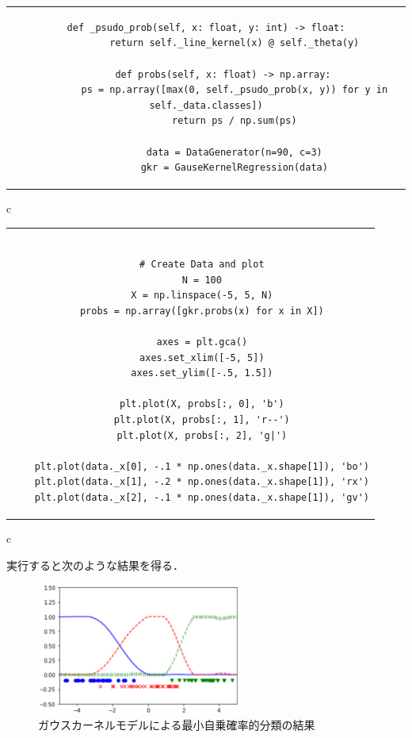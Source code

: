 \documentclass[fleqn]{jsarticle}
\begin{document}
\begin{center}
\begin{tabular}{c}
\begin{lstlisting}[]
      def _psudo_prob(self, x: float, y: int) -> float:
          return self._line_kernel(x) @ self._theta(y)

      def probs(self, x: float) -> np.array:
          ps = np.array([max(0, self._psudo_prob(x, y)) for y in self._data.classes])
          return ps / np.sum(ps)

          data = DataGenerator(n=90, c=3)
          gkr = GauseKernelRegression(data)
  \end{lstlisting}
\end{tabular}{c}
\end{center}

\begin{center}
  \begin{tabular}{c}
  \begin{lstlisting}[]

    # Create Data and plot
    N = 100
    X = np.linspace(-5, 5, N)
    probs = np.array([gkr.probs(x) for x in X])

    axes = plt.gca()
    axes.set_xlim([-5, 5])
    axes.set_ylim([-.5, 1.5])

    plt.plot(X, probs[:, 0], 'b')
    plt.plot(X, probs[:, 1], 'r--')
    plt.plot(X, probs[:, 2], 'g|')

    plt.plot(data._x[0], -.1 * np.ones(data._x.shape[1]), 'bo')
    plt.plot(data._x[1], -.2 * np.ones(data._x.shape[1]), 'rx')
    plt.plot(data._x[2], -.1 * np.ones(data._x.shape[1]), 'gv')

  \end{lstlisting}
\end{tabular}{c}
\end{center}

実行すると次のような結果を得る．
\begin{figure}[h]
  \begin{center}
    \includegraphics[width=0.6\textwidth]{figs/LogisticRegression.eps}
  \end{center}
  \caption{ガウスカーネルモデルによる最小自乗確率的分類の結果}
\end{figure}
\end{document}
